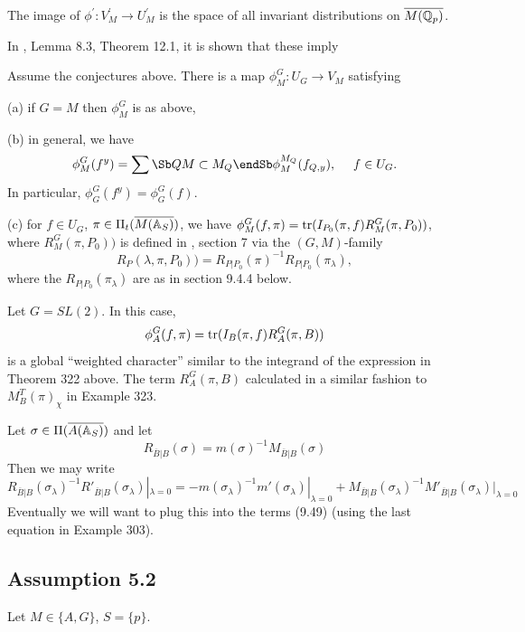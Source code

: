 \begin{conjecture}
The image of $\phi ^{\prime }:V_M^{\prime }\rightarrow U_M^{\prime }$ is the
space of all invariant distributions on
$\overline{M({\Bbb {Q}}_p)}$.
\end{conjecture}

In \cite{A6}, Lemma 8.3, Theorem 12.1, it is shown that these imply

\begin{theorem} Assume the conjectures above.
There is a map $\phi^G_M :U_G\rightarrow V_M$ satisfying

(a) if $G=M$ then $\phi^G_M$ is as above,

(b) in general, we have
\[
\phi_M^G(f^y)=
\sum\Sb Q \\ M\subset M_Q\endSb
\phi_M^{M_Q}(f_{Q,y}),\ \ \ \ f\in U_G.
\]
In particular, $\phi_G^G(f^y)=\phi_G^G(f)$.

(c) for $f\in U_G$, $\pi\in \Pi_t(\overline{M({\Bbb{A}}_S)})$,
we have $\phi^G_M(f,\pi)={\rm tr}(I_{P_0}(\pi,f)R_M^G(\pi,P_0))$,
where $R_M^G(\pi,P_0))$ is defined in \cite{A6}, section 7
via the $(G,M)$-family
\[
R_P(\lambda, \pi,P_0))=
R_{P|P_0}(\pi)^{-1}R_{P|P_0}(\pi_\lambda),
\]
where the $R_{P|P_0}(\pi_\lambda)$ are as in section 9.4.4 below.
\end{theorem}

\begin{example} Let $G=SL(2)$. In this case,
\[
\phi^G_A(f,\pi)={\rm tr}(I_{B}(\pi,f)R_A^G(\pi,B))
\]
is a global ``weighted character'' similar to the integrand of
the expression in Theorem 322 above. The term $R_A^G(\pi,B)$
calculated in a similar fashion to $M_B^T(\pi)_\chi$
in Example 323.
\end{example}

Let $\sigma\in \Pi(\overline{A({\Bbb{A}}_S)})$ and let
\[
R_{\overline{B}|B}(\sigma)
=m(\sigma)^{-1}M_{\overline{B}|B}(\sigma)
\]
Then we may write  
\[
R_{\overline{B}|B}(\sigma_\lambda)^{-1}
R'_{\overline{B}|B}(\sigma_\lambda)|_{\lambda =0}
=-m(\sigma_\lambda)^{-1}m'(\sigma_\lambda)|_{\lambda =0}
+M_{\overline{B}|B}(\sigma_\lambda)^{-1}
M'_{\overline{B}|B}(\sigma_\lambda)|_{\lambda =0}
\]
Eventually we will want to plug this into the terms 
(9.49) (using the last equation in Example 303). 

\subsection{Assumption 5.2}

Let $M\in \{A,G\}$, $S=\{p\}$.


